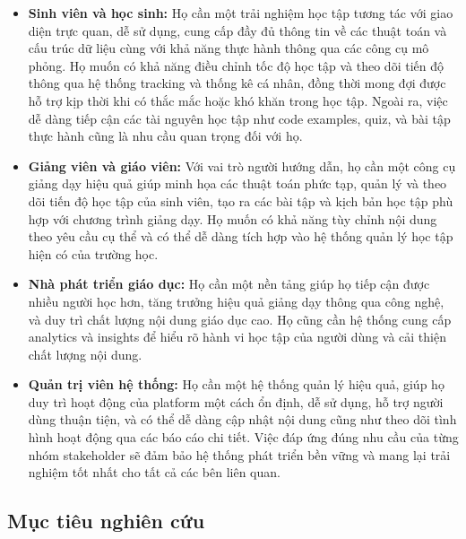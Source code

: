 \begin{itemize}
\item \textbf{Sinh viên và học sinh:} Họ cần một trải nghiệm học tập tương tác với giao diện trực quan, dễ sử dụng, cung cấp đầy đủ thông tin về các thuật toán và cấu trúc dữ liệu cùng với khả năng thực hành thông qua các công cụ mô phỏng. Họ muốn có khả năng điều chỉnh tốc độ học tập và theo dõi tiến độ thông qua hệ thống tracking và thống kê cá nhân, đồng thời mong đợi được hỗ trợ kịp thời khi có thắc mắc hoặc khó khăn trong học tập. Ngoài ra, việc dễ dàng tiếp cận các tài nguyên học tập như code examples, quiz, và bài tập thực hành cũng là nhu cầu quan trọng đối với họ.

\item \textbf{Giảng viên và giáo viên:} Với vai trò người hướng dẫn, họ cần một công cụ giảng dạy hiệu quả giúp minh họa các thuật toán phức tạp, quản lý và theo dõi tiến độ học tập của sinh viên, tạo ra các bài tập và kịch bản học tập phù hợp với chương trình giảng dạy. Họ muốn có khả năng tùy chỉnh nội dung theo yêu cầu cụ thể và có thể dễ dàng tích hợp vào hệ thống quản lý học tập hiện có của trường học.

\item \textbf{Nhà phát triển giáo dục:} Họ cần một nền tảng giúp họ tiếp cận được nhiều người học hơn, tăng trưởng hiệu quả giảng dạy thông qua công nghệ, và duy trì chất lượng nội dung giáo dục cao. Họ cũng cần hệ thống cung cấp analytics và insights để hiểu rõ hành vi học tập của người dùng và cải thiện chất lượng nội dung.

\item \textbf{Quản trị viên hệ thống:} Họ cần một hệ thống quản lý hiệu quả, giúp họ duy trì hoạt động của platform một cách ổn định, dễ sử dụng, hỗ trợ người dùng thuận tiện, và có thể dễ dàng cập nhật nội dung cũng như theo dõi tình hình hoạt động qua các báo cáo chi tiết. Việc đáp ứng đúng nhu cầu của từng nhóm stakeholder sẽ đảm bảo hệ thống phát triển bền vững và mang lại trải nghiệm tốt nhất cho tất cả các bên liên quan.
\end{itemize}

\subsection{Mục tiêu nghiên cứu}
\label{subsec:objectives}

